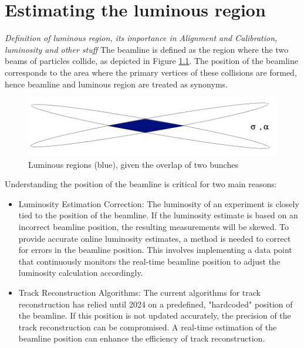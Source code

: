 \chapter{Estimating the luminous region}
\textit{Definition of luminous region, its importance in Alignment and Calibration, luminosity and other stuff}
The beamline is defined as the region where the two beams of particles collide, as depicted in Figure \ref{fig:luminous-region}. The position of the beamline corresponds to the area where the primary vertices of these collisions are formed, hence beamline and luminous region are treated as synonyms.



\begin{figure}
    \centering
    \includegraphics[width=\textwidth]{figures/luminous_region.png}
    \caption{Luminous regions (blue), given the overlap of two bunches}
    \label{fig:luminous-region}
\end{figure}



Understanding the position of the beamline is critical for two main reasons:
\begin{itemize}
\item Luminosity Estimation Correction: The luminosity of an experiment is closely tied to the position of the beamline. If the luminosity estimate is based on an incorrect beamline position, the resulting measurements will be skewed. To provide accurate online luminosity estimates, a method is needed to correct for errors in the beamline position. This involves implementing a data point that continuously monitors the real-time beamline position to adjust the luminosity calculation accordingly.
\item Track Reconstruction Algorithms: The current algorithms for track reconstruction has relied until 2024 on a predefined, "hardcoded" position of the beamline. If this position is not updated accurately, the precision of the track reconstruction can be compromised. A real-time estimation of the beamline position can enhance the efficiency of track reconstruction.
\end{itemize}

